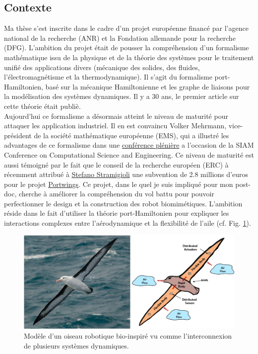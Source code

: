 \documentclass[french]{article}
\begin{document}
\subsection{Contexte}

Ma thèse s'est inscrite dans le cadre d'un projet européenne financé par l'agence national de la recherche (ANR) et la Fondation allemande pour la recherche (DFG). L'ambition du projet était de pousser la compréhension d'un formalisme mathématique issu de la physique et de la théorie des systèmes pour le traitement unifié des applications divers (mécanique des solides, des fluides, l'électromagnétisme et la thermodynamique). Il s'agit du formalisme port-Hamiltonien, bas\'e sur la mécanique Hamiltonienne et les graphe de liaisons pour la modélisation des systèmes dynamiques. Il y a 30 ans, le premier article sur cette théorie était publi\`e.  \\

Aujourd'hui ce formalisme a désormais atteint le niveau de maturit\'e pour attaquer les application industriel. Il en est convaincu Volker Mehrmann, vice-président de la société mathématique européenne (EMS), qui a illustré les advantages de ce formalisme dans une \href{https://meetings.siam.org/sess/dsp_programsess.cfm?SESSIONCODE=70329}{conférence plénière} a l'occasion de la SIAM Conference on Computational Science and Engineering. Ce niveau de maturit\'e est aussi témoigné par le fait que le conseil de la recherche européen (ERC) \`a récemment attribu\'e \`a \href{https://people.utwente.nl/s.stramigioli?tab=about-me}{Stefano Stramigioli} une subvention de 2.8 millions d'euros pour le projet \href{http://www.portwings.eu/}{Portwings}. Ce projet, dans le quel je suis impliqu\'e pour mon post-doc, cherche \`a améliorer la compréhension du vol battu pour pouvoir perfectionner le design et la construction des robot biomimétiques. L'ambition réside dans le fait d'utiliser la théorie port-Hamiltonien pour expliquer les interactions complexes entre l'aérodynamique et la flexibilit\'e de l'aile (cf. Fig. \ref{fig:pH_view_bird}).

\begin{figure}[tb]
	\centering
	\includegraphics[width = \textwidth]{Bird_Port_Hamiltonian_Subsystems_FULL_ARC.eps}
	\caption{Modèle d'un oiseau robotique bio-inspiré vu comme l'interconnexion de plusieurs systèmes dynamiques. }
	\label{fig:pH_view_bird}
\end{figure}
\end{document}
